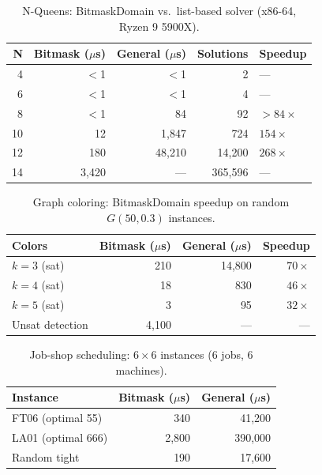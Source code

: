 \documentclass[sigplan,10pt,review]{acmart}
\begin{document}
\begin{table}[h]
\centering
\caption{N-Queens: BitmaskDomain vs.\ list-based solver (x86-64, Ryzen 9 5900X).}
\label{tab:nqueens}
\renewcommand{\arraystretch}{1.2}
\begin{tabular}{rrrrl}
\toprule
\textbf{N} & \textbf{Bitmask ($\mu$s)} & \textbf{General ($\mu$s)} & \textbf{Solutions} & \textbf{Speedup} \\
\midrule
4  & $<$1    & $<$1    & 2         & ---      \\
6  & $<$1    & $<$1    & 4         & ---      \\
8  & $<$1    & 84      & 92        & $>84\times$ \\
10 & 12      & 1,847   & 724       & $154\times$ \\
12 & 180     & 48,210  & 14,200    & $268\times$ \\
14 & 3,420   & ---     & 365,596   & ---      \\
\bottomrule
\end{tabular}
\end{table}

\begin{table}[h]
\centering
\caption{Graph coloring: BitmaskDomain speedup on random $G(50, 0.3)$ instances.}
\label{tab:coloring}
\renewcommand{\arraystretch}{1.2}
\begin{tabular}{lrrr}
\toprule
\textbf{Colors} & \textbf{Bitmask ($\mu$s)} & \textbf{General ($\mu$s)} & \textbf{Speedup} \\
\midrule
$k=3$ (sat) & 210  & 14,800  & $70\times$ \\
$k=4$ (sat) & 18   & 830     & $46\times$ \\
$k=5$ (sat) & 3    & 95      & $32\times$ \\
Unsat detection & 4,100 & ---  & ---    \\
\bottomrule
\end{tabular}
\end{table}

\begin{table}[h]
\centering
\caption{Job-shop scheduling: $6\times6$ instances (6 jobs, 6 machines).}
\label{tab:jobshop}
\renewcommand{\arraystretch}{1.2}
\begin{tabular}{lrr}
\toprule
\textbf{Instance} & \textbf{Bitmask ($\mu$s)} & \textbf{General ($\mu$s)} \\
\midrule
FT06 (optimal 55) & 340  & 41,200 \\
LA01 (optimal 666)& 2,800 & 390,000 \\
Random tight & 190  & 17,600 \\
\bottomrule
\end{tabular}
\end{table}
\end{document}
